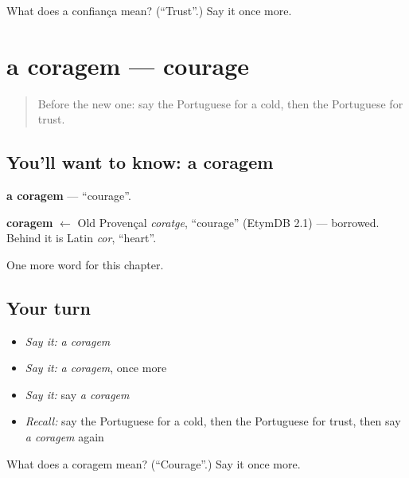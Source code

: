\begin{tcolorbox}[breakable,colback=teal!4,colframe=teal!35!black,title={Before you move on}]
What does a confiança mean? (\textquotedblleft{}Trust\textquotedblright{}.) Say it once more.
\end{tcolorbox}
\section[a coragem]{a coragem — courage}

\label{lesson:PT-C181-coragem}



\begin{quote}
Before the new one: say the Portuguese for a cold, then the Portuguese for trust.
\end{quote}

\subsection*{You'll want to know: a coragem}
\textbf{a coragem} — \textquotedblleft{}courage\textquotedblright{}.

\begin{cousinweb}
\textbf{coragem} $\leftarrow$ Old Provençal \emph{coratge}, \textquotedblleft{}courage\textquotedblright{} (EtymDB 2.1) — borrowed. Behind it is Latin \emph{cor}, \textquotedblleft{}heart\textquotedblright{}.
\end{cousinweb}

\begin{grammarlens}[title={What you've built}]
One more word for this chapter.
\end{grammarlens}

\subsection*{Your turn}
\begin{itemize}
\raggedright
  \item \emph{Say it:} \emph{a coragem}
  \item \emph{Say it:} \emph{a coragem}, once more
  \item \emph{Say it:} say \emph{a coragem}
  \item \emph{Recall:} say the Portuguese for a cold, then the Portuguese for trust, then say \emph{a coragem} again
\end{itemize}

\begin{tcolorbox}[breakable,colback=teal!4,colframe=teal!35!black,title={Before you move on}]
What does a coragem mean? (\textquotedblleft{}Courage\textquotedblright{}.) Say it once more.
\end{tcolorbox}
